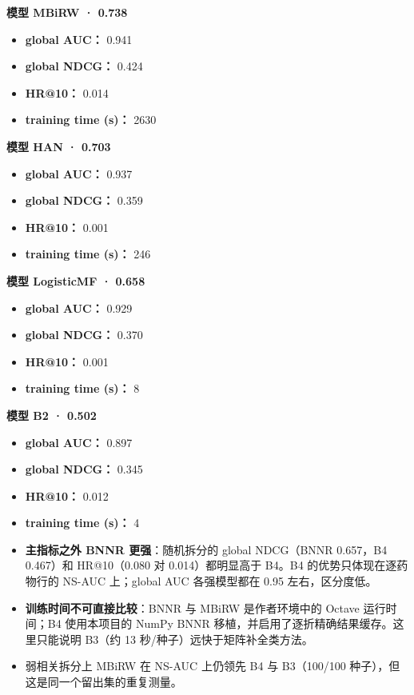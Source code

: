 \documentclass[
  10pt,
]{ctexart}
\providecommand{\tightlist}{%
  \setlength{\itemsep}{0pt}\setlength{\parskip}{0pt}}
\begin{document}
\textbf{模型 MBiRW · 0.738}

\begin{itemize}
\tightlist
\item
  \textbf{global AUC：} 0.941
\item
  \textbf{global NDCG：} 0.424
\item
  \textbf{HR@10：} 0.014
\item
  \textbf{training time (s)：} 2630
\end{itemize}

\textbf{模型 HAN · 0.703}

\begin{itemize}
\tightlist
\item
  \textbf{global AUC：} 0.937
\item
  \textbf{global NDCG：} 0.359
\item
  \textbf{HR@10：} 0.001
\item
  \textbf{training time (s)：} 246
\end{itemize}

\textbf{模型 LogisticMF · 0.658}

\begin{itemize}
\tightlist
\item
  \textbf{global AUC：} 0.929
\item
  \textbf{global NDCG：} 0.370
\item
  \textbf{HR@10：} 0.001
\item
  \textbf{training time (s)：} 8
\end{itemize}

\textbf{模型 B2 · 0.502}

\begin{itemize}
\item
  \textbf{global AUC：} 0.897
\item
  \textbf{global NDCG：} 0.345
\item
  \textbf{HR@10：} 0.012
\item
  \textbf{training time (s)：} 4
\item
  \textbf{主指标之外 BNNR 更强}：随机拆分的 global NDCG（BNNR 0.657，B4
  0.467）和 HR@10（0.080 对 0.014）都明显高于 B4。B4
  的优势只体现在逐药物行的 NS-AUC 上；global AUC 各强模型都在 0.95
  左右，区分度低。
\item
  \textbf{训练时间不可直接比较}：BNNR 与 MBiRW 是作者环境中的 Octave
  运行时间；B4 使用本项目的 NumPy BNNR
  移植，并启用了逐折精确结果缓存。这里只能说明 B3（约 13
  秒/种子）远快于矩阵补全类方法。
\item
  弱相关拆分上 MBiRW 在 NS-AUC 上仍领先 B4 与 B3（100/100
  种子），但这是同一个留出集的重复测量。
\end{itemize}
\end{document}
